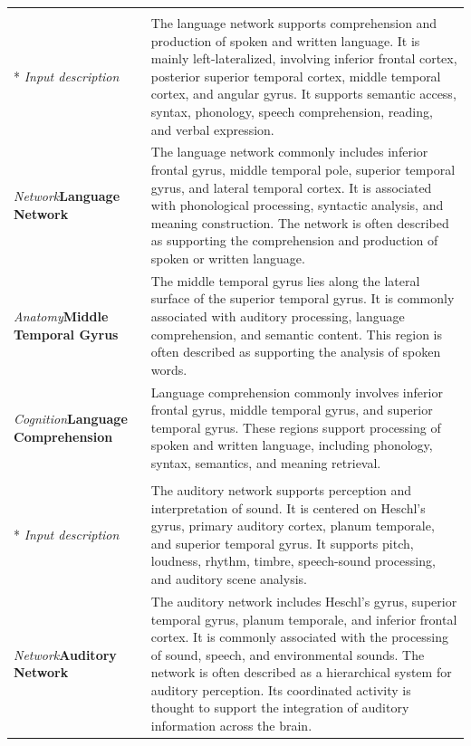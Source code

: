 {\begin{longtable}{@{}>{\raggedright\arraybackslash\hspace{0pt}}p{1.05in}>{\raggedright\arraybackslash\hspace{0pt}}p{3.98in}@{}}
\midrule
\multicolumn{2}{@{}l}{\textbf{Language} (Glasser Language)} \\*
\textit{Input description} & The language network supports comprehension and production of spoken and written language. It is mainly left-lateralized, involving inferior frontal cortex, posterior superior temporal cortex, middle temporal cortex, and angular gyrus. It supports semantic access, syntax, phonology, speech comprehension, reading, and verbal expression. \\[3pt]
\textit{Network}\newline\hspace{0pt}\textbf{Language Network} & The language network commonly includes inferior frontal gyrus, middle temporal pole, superior temporal gyrus, and lateral temporal cortex. It is associated with phonological processing, syntactic analysis, and meaning construction. The network is often described as supporting the comprehension and production of spoken or written language. \\[3pt]
\textit{Anatomy}\newline\hspace{0pt}\textbf{Middle Temporal Gyrus} & The middle temporal gyrus lies along the lateral surface of the superior temporal gyrus. It is commonly associated with auditory processing, language comprehension, and semantic content. This region is often described as supporting the analysis of spoken words. \\[3pt]
\textit{Cognition}\newline\hspace{0pt}\textbf{Language Comprehension} & Language comprehension commonly involves inferior frontal gyrus, middle temporal gyrus, and superior temporal gyrus. These regions support processing of spoken and written language, including phonology, syntax, semantics, and meaning retrieval. \\
\midrule
\multicolumn{2}{@{}l}{\textbf{Auditory} (Shirer Auditory)} \\*
\textit{Input description} & The auditory network supports perception and interpretation of sound. It is centered on Heschl's gyrus, primary auditory cortex, planum temporale, and superior temporal gyrus. It supports pitch, loudness, rhythm, timbre, speech-sound processing, and auditory scene analysis. \\[3pt]
\textit{Network}\newline\hspace{0pt}\textbf{Auditory Network} & The auditory network includes Heschl's gyrus, superior temporal gyrus, planum temporale, and inferior frontal cortex. It is commonly associated with the processing of sound, speech, and environmental sounds. The network is often described as a hierarchical system for auditory perception. Its coordinated activity is thought to support the integration of auditory information across the brain. \\[3pt]

\end{longtable}}

